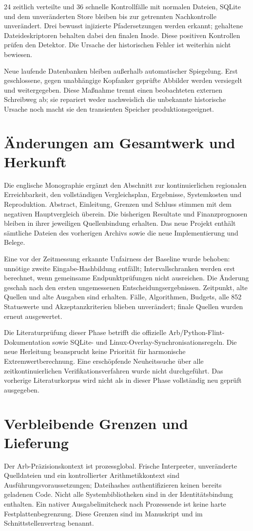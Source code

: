 \documentclass[11pt,a4paper]{article}
\begin{document}
24 zeitlich verteilte und 36 schnelle Kontrollfälle mit normalen Dateien, SQLite und dem unveränderten Store bleiben bis zur getrennten Nachkontrolle unverändert. Drei bewusst injizierte Pfadersetzungen werden erkannt; gehaltene Dateideskriptoren behalten dabei den finalen Inode. Diese positiven Kontrollen prüfen den Detektor. Die Ursache der historischen Fehler ist weiterhin nicht bewiesen.

Neue laufende Datenbanken bleiben außerhalb automatischer Spiegelung. Erst geschlossene, gegen unabhängige Kopfanker geprüfte Abbilder werden versiegelt und weitergegeben. Diese Maßnahme trennt einen beobachteten externen Schreibweg ab; sie repariert weder nachweislich die unbekannte historische Ursache noch macht sie den transienten Speicher produktionsgeeignet.

\section*{Änderungen am Gesamtwerk und Herkunft}
Die englische Monographie ergänzt den Abschnitt zur kontinuierlichen regionalen Erreichbarkeit, den vollständigen Vergleichsplan, Ergebnisse, Systemkosten und Reproduktion. Abstract, Einleitung, Grenzen und Schluss stimmen mit dem negativen Hauptvergleich überein. Die bisherigen Resultate und Finanzprognosen bleiben in ihrer jeweiligen Quellenbindung erhalten. Das neue Projekt enthält sämtliche Dateien des vorherigen Archivs sowie die neue Implementierung und Belege.

Eine vor der Zeitmessung erkannte Unfairness der Baseline wurde behoben: unnötige zweite Eingabe-Hashbildung entfällt; Intervallschranken werden erst berechnet, wenn gemeinsame Endpunktprüfungen nicht ausreichen. Die Änderung geschah nach den ersten ungemessenen Entscheidungsergebnissen. Zeitpunkt, alte Quellen und alte Ausgaben sind erhalten. Fälle, Algorithmen, Budgets, alle 852 Statuswerte und Akzeptanzkriterien blieben unverändert; finale Quellen wurden erneut ausgewertet.

Die Literaturprüfung dieser Phase betrifft die offizielle Arb/Python-Flint-Dokumentation sowie SQLite- und Linux-Overlay-Synchronisationsregeln. Die neue Herleitung beansprucht keine Priorität für harmonische Extremwertberechnung. Eine erschöpfende Neuheitssuche über alle zeitkontinuierlichen Verifikationsverfahren wurde nicht durchgeführt. Das vorherige Literaturkorpus wird nicht als in dieser Phase vollständig neu geprüft ausgegeben.

\section*{Verbleibende Grenzen und Lieferung}
Der Arb-Präzisionskontext ist prozessglobal. Frische Interpreter, unveränderte Quelldateien und ein kontrollierter Arithmetikkontext sind Ausführungsvoraussetzungen; Dateihashes authentifizieren keinen bereits geladenen Code. Nicht alle Systembibliotheken sind in der Identitätsbindung enthalten. Ein nativer Ausgabelimitcheck nach Prozessende ist keine harte Festplattenbegrenzung. Diese Grenzen sind im Manuskript und im Schnittstellenvertrag benannt.
\end{document}
